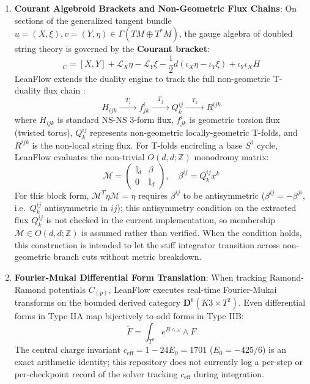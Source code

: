 \documentclass[11pt,a4paper]{article}
\begin{document}
\begin{enumerate}
    \item \textbf{Courant Algebroid Brackets and Non-Geometric Flux Chains}: On sections of the generalized tangent bundle $u = (X, \xi), v = (Y, \eta) \in \Gamma(TM \oplus T^*M)$, the gauge algebra of doubled string theory is governed by the \textbf{Courant bracket}:
    \begin{equation}
    [u, v]_C = [X, Y] + \mathcal{L}_X \eta - \mathcal{L}_Y \xi - \frac{1}{2} d \left( \iota_X \eta - \iota_Y \xi \right) + \iota_Y \iota_X H
    \end{equation}
    LeanFlow extends the duality engine to track the full non-geometric T-duality flux chain \cite{shelton2005, aldazabal2013}:
    \begin{equation}
    H_{ijk} \xrightarrow{\quad T_i \quad} f^i_{jk} \xrightarrow{\quad T_j \quad} Q^{ij}_k \xrightarrow{\quad T_k \quad} R^{ijk}
    \end{equation}
    where $H_{ijk}$ is standard NS-NS 3-form flux, $f^i_{jk}$ is geometric torsion flux (twisted torus), $Q^{ij}_k$ represents non-geometric locally-geometric T-folds, and $R^{ijk}$ is the non-local string flux. For T-folds encircling a base $S^1$ cycle, LeanFlow evaluates the non-trivial $O(d, d; \mathbb{Z})$ monodromy matrix:
    \begin{equation}
    \mathcal{M} = \begin{pmatrix} \mathbb{I}_d & \beta \\ 0 & \mathbb{I}_d \end{pmatrix}, \quad \beta^{ij} = Q^{ij}_k x^k
    \end{equation}
    For this block form, $\mathcal{M}^T \eta \mathcal{M} = \eta$ requires $\beta^{ij}$ to be antisymmetric ($\beta^{ij} = -\beta^{ji}$, i.e.\ $Q^{ij}_k$ antisymmetric in $ij$); this antisymmetry condition on the extracted flux $Q^{ij}_k$ is not checked in the current implementation, so membership $\mathcal{M} \in O(d,d;\mathbb{Z})$ is assumed rather than verified. When the condition holds, this construction is intended to let the stiff integrator transition across non-geometric branch cuts without metric breakdown.

    \item \textbf{Fourier-Mukai Differential Form Translation}: When tracking Ramond-Ramond potentials $C_{(p)}$, LeanFlow executes real-time Fourier-Mukai transforms on the bounded derived category $\mathbf{D}^b(K3 \times T^2)$. Even differential forms in Type IIA map bijectively to odd forms in Type IIB:
    \begin{equation}
    \widetilde{F} = \int_{T^2} e^{B \wedge \omega} \wedge F
    \end{equation}
    The central charge invariant $c_{\text{eff}} = 1 - 24 E_0 = 1701$ ($E_0 = -425/6$) is an exact arithmetic identity; this repository does not currently log a per-step or per-checkpoint record of the solver tracking $c_{\text{eff}}$ during integration.


\end{enumerate}
\end{document}
